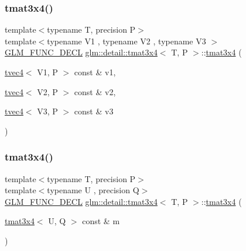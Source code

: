 \subsubsection{\texorpdfstring{tmat3x4()}{tmat3x4()}\hspace{0.1cm}{\footnotesize\ttfamily [9/22]}}
{\footnotesize\ttfamily template$<$typename T, precision P$>$ \\
template$<$typename V1 , typename V2 , typename V3 $>$ \\
\hyperlink{setup_8hpp_ab2d052de21a70539923e9bcbf6e83a51}{G\+L\+M\+\_\+\+F\+U\+N\+C\+\_\+\+D\+E\+CL} \hyperlink{structglm_1_1detail_1_1tmat3x4}{glm\+::detail\+::tmat3x4}$<$ T, P $>$\+::\hyperlink{structglm_1_1detail_1_1tmat3x4}{tmat3x4} (\begin{DoxyParamCaption}\item[{\hyperlink{structglm_1_1detail_1_1tvec4}{tvec4}$<$ V1, P $>$ const \&}]{v1,  }\item[{\hyperlink{structglm_1_1detail_1_1tvec4}{tvec4}$<$ V2, P $>$ const \&}]{v2,  }\item[{\hyperlink{structglm_1_1detail_1_1tvec4}{tvec4}$<$ V3, P $>$ const \&}]{v3 }\end{DoxyParamCaption})}

\mbox{\label{structglm_1_1detail_1_1tmat3x4_ac2ddd33140b6f24cf36d4b7e92a8ca02}} 
\subsubsection{\texorpdfstring{tmat3x4()}{tmat3x4()}\hspace{0.1cm}{\footnotesize\ttfamily [10/22]}}
{\footnotesize\ttfamily template$<$typename T, precision P$>$ \\
template$<$typename U , precision Q$>$ \\
\hyperlink{setup_8hpp_ab2d052de21a70539923e9bcbf6e83a51}{G\+L\+M\+\_\+\+F\+U\+N\+C\+\_\+\+D\+E\+CL} \hyperlink{structglm_1_1detail_1_1tmat3x4}{glm\+::detail\+::tmat3x4}$<$ T, P $>$\+::\hyperlink{structglm_1_1detail_1_1tmat3x4}{tmat3x4} (\begin{DoxyParamCaption}\item[{\hyperlink{structglm_1_1detail_1_1tmat3x4}{tmat3x4}$<$ U, Q $>$ const \&}]{m }\end{DoxyParamCaption})\hspace{0.3cm}{\ttfamily [explicit]}}

